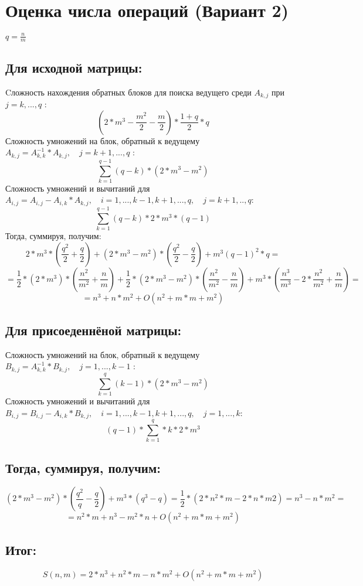 \documentclass[a4paper,12pt]{article}
\begin{document}
\section{Оценка числа операций (Вариант 2)}
$q = \frac{n}{m}$\\
\subsection{Для исходной матрицы:}
Cложность нахождения обратных блоков для поиска ведущего среди $A_{k,j}$ при $j = k,...,q$ :\\
$$(2*m^{3} - \frac{m^{2}}{2} - \frac{m}{2}) * \frac{1 + q}{2} * q$$ 
Сложность умножений на блок, обратный к ведущему $A_{k, j} = A_{k, k}^{-1} * A_{k, j},
\quad j = k + 1,...,q$ :\\
$$\sum\limits_{k=1}^{q-1}(q - k)*(2*m^{3}-m^{2})$$
Сложность умножений и вычитаний для 
$A_{i, j} = A_{i, j} - A_{i, k} * A_{k, j}, \quad i = 1,...,k-1,k+1,...,q,
\quad j = k + 1,..,q$:\\
$$\sum\limits_{k=1}^{q-1}(q-k)*2*m^{3}*(q-1)$$
Тогда, суммируя, получим: 
$$ 2*m^{3}*(\frac{q^{2}}{2} + \frac{q}{2}) + (2*m^{3}-m^{2})*(\frac{q^{2}}{2} - \frac{q}{2})
+ m^{3}(q - 1)^{2}*q = $$
$$=\frac{1}{2} * (2*m^{3}) * (\frac{n^{2}}{m^{2}} + \frac{n}{m}) + \frac{1}{2} * (2*m^{3} - m^{2})
*(\frac{n^{2}}{m^{2}} - \frac{n}{m}) + m^{3}*(\frac{n^{3}}{m^{3}} - 2*\frac{n^{2}}{m^{2}} +
\frac{n}{m}) = $$
$$ = n^{3} + n*m^{2} + O(n^{2} + m*m + m^{2})$$
\subsection{Для присоеденнёной матрицы:}
Сложность умножений на блок, обратный к ведущему $B_{k, j} = A_{k, k}^{-1} * B_{k, j},
\quad j = 1,...,k-1$ :\\
$$\sum\limits_{k=1}^{q}(k-1)*(2*m^{3} - m^{2})$$
Сложность умножений и вычитаний для 
$B_{i, j} = B_{i, j} - A_{i, k} * B_{k, j}, \quad i = 1,...,k-1,k+1,...,q,
\quad j = 1,...,k$:\\
$$(q-1)*\sum\limits_{k=1}^{q}*k*2*m^{3}$$
\subsection{Тогда, суммируя, получим:}
$$(2*m^{3} - m^{2})*(\frac{q^{2}}{q} - \frac{q}{2}) + m^{3}*(q^{3} - q) = 
\frac{1}{2}*(2*n^{2}*m - 2*n*m{2}) = n^{3} - n*m^{2} = $$
$$ = n^{2}*m + n^{3} - m^{2} * n + O(n^{2} + m*m + m^{2})$$
\subsection{Итог:}
$$S(n, m) = 2*n^{3} + n^{2}*m - n*m^{2} + O(n^{2} + m*m + m^{2})$$
\end{document}
